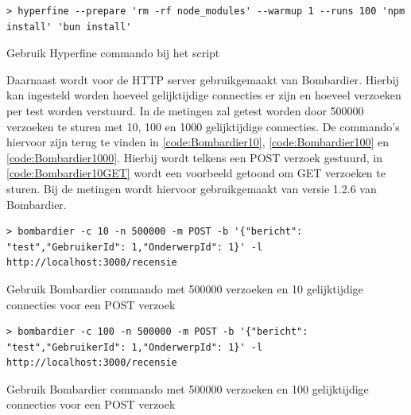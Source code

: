 \begin{listing}[H]
  \centering
  \begin{verbatim}
> hyperfine --prepare 'rm -rf node_modules' --warmup 1 --runs 100 'npm install' 'bun install'
      \end{verbatim}
      \caption{\label{code:HyperfineInstall}Gebruik Hyperfine commando bij het script}
\end{listing}
Daarnaast wordt voor de HTTP server gebruikgemaakt van Bombardier. 
Hierbij kan ingesteld worden hoeveel gelijktijdige connecties er zijn en hoeveel verzoeken per test worden verstuurd.
In de metingen zal getest worden door 500000 verzoeken te sturen met 10, 100 en 1000 gelijktijdige connecties.
De commando's hiervoor zijn terug te vinden in \ref{code:Bombardier10}, \ref{code:Bombardier100} en \ref{code:Bombardier1000}.
Hierbij wordt telkens een POST verzoek gestuurd, in \ref{code:Bombardier10GET} wordt een voorbeeld getoond om GET verzoeken te sturen.
Bij de metingen wordt hiervoor gebruikgemaakt van versie 1.2.6 van Bombardier.
\begin{listing}[H]
  \centering
  \begin{verbatim}
> bombardier -c 10 -n 500000 -m POST -b '{"bericht": "test","GebruikerId": 1,"OnderwerpId": 1}' -l http://localhost:3000/recensie
      \end{verbatim}
      \caption{\label{code:Bombardier10}Gebruik Bombardier commando met 500000 verzoeken en 10 gelijktijdige connecties voor een POST verzoek}
\end{listing}
\begin{listing}[H]
  \centering
  \begin{verbatim}
> bombardier -c 100 -n 500000 -m POST -b '{"bericht": "test","GebruikerId": 1,"OnderwerpId": 1}' -l http://localhost:3000/recensie
      \end{verbatim}
      \caption{\label{code:Bombardier100}Gebruik Bombardier commando met 500000 verzoeken en 100 gelijktijdige connecties voor een POST verzoek}
\end{listing}
